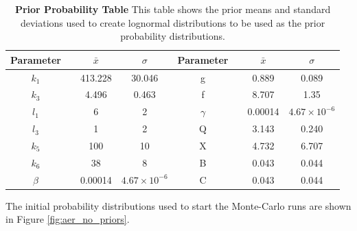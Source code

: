 \begin{table}[ht]%
\renewcommand{\arraystretch}{1.5}
\begin{center}
\begin{tabular}{cccc|cccc}
\toprule
\textbf{Parameter} && ${\bar{x}}$ & $\sigma$ & \textbf{Parameter} && ${\bar{x}}$ & $\sigma$\\
\midrule
$k_1$ && 413.228 & 30.046 & g && 0.889 & 0.089\\
$k_3$ && 4.496 & 0.463 & f && 8.707 & 1.35\\
$l_1$ && 6 & 2 & $\gamma$ && 0.00014 & $4.67\times 10^{-6}$\\
$l_3$ && 1 & 2 & Q && 3.143 & 0.240\\
$k_5$ && 100 & 10 & X && 4.732 & 6.707\\
$k_6$ && 38 & 8 & B && 0.043 & 0.044\\
$\beta$ && 0.00014 & $4.67\times 10^{-6}$ & C && 0.043 & 0.044\\
\bottomrule
\end{tabular}
\end{center}
\caption[Prior Probability Table]{{\bf Prior Probability Table} This table shows the prior means and standard deviations used to create lognormal distributions to be used as the prior probability distributions.
\label{tab:noProbstat1}}
\end{table}
\afterpage{\clearpage}
The initial probability distributions used to start the Monte-Carlo runs are shown in Figure \ref{fig:aer_no_priors}.
